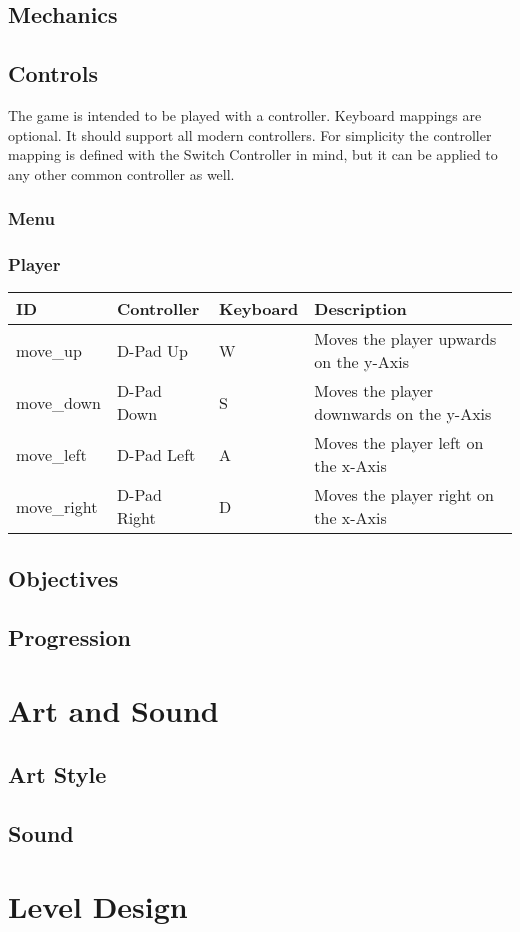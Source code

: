 \documentclass[pdftex,12pt,a4paper,ngerman,dvipsnames]{scrreport}
\begin{document}
\section{Mechanics}
\section{Controls}
The game is intended to be played with a controller. Keyboard mappings are
optional. It should support all modern controllers. For simplicity the
controller mapping is defined with the Switch Controller in mind, but it can be
applied to any other common controller as well.
\subsection{Menu}
\subsection{Player}
\begin{tabular}{l|l|l|l}
  ID & Controller & Keyboard & Description \\ \hline
  move\_up & D-Pad Up & W & Moves the player upwards on the y-Axis \\
  move\_down & D-Pad Down & S & Moves the player downwards on the y-Axis \\
  move\_left & D-Pad Left & A & Moves the player left on the x-Axis \\
  move\_right & D-Pad Right & D & Moves the player right on the x-Axis \\
\end{tabular}
\section{Objectives}
\section{Progression}
\chapter{Art and Sound}
\section{Art Style}
\section{Sound}
\chapter{Level Design}
\end{document}

